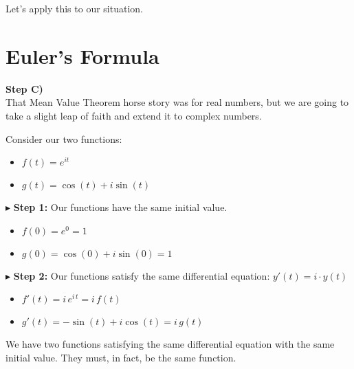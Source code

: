 \documentclass{ximera}
\begin{document}
Let's apply this to our situation. \\















\section{Euler's Formula}


\textbf{\textcolor{purple!85!blue}{Step C)}} \\


That Mean Value Theorem horse story was for real numbers, but we are going to take a slight leap of faith and extend it to complex numbers.




Consider our two functions:


\begin{itemize}
	\item $f(t) = e^{i t}$
	\item $g(t) = \cos(t) + i \sin(t)$
\end{itemize}




$\blacktriangleright$   \textbf{Step 1:} Our functions have the same initial value.

\begin{itemize}
	\item $f(0) = e^0 = 1$
	\item $g(0) = \cos(0) + i \sin(0) = 1$
\end{itemize}





$\blacktriangleright$   \textbf{Step 2:} Our functions satisfy the same differential equation: $y'(t) = i \cdot y(t)$



\begin{itemize}
	\item $f'(t) = i \, e^{i \, t} = i \, f(t)$
	\item $g'(t) = -\sin(t) + i \cos(t) = i \, g(t)$
\end{itemize}



We have two functions satisfying the same differential equation with the same initial value.  They must, in fact, be the same function. \\
\end{document}

